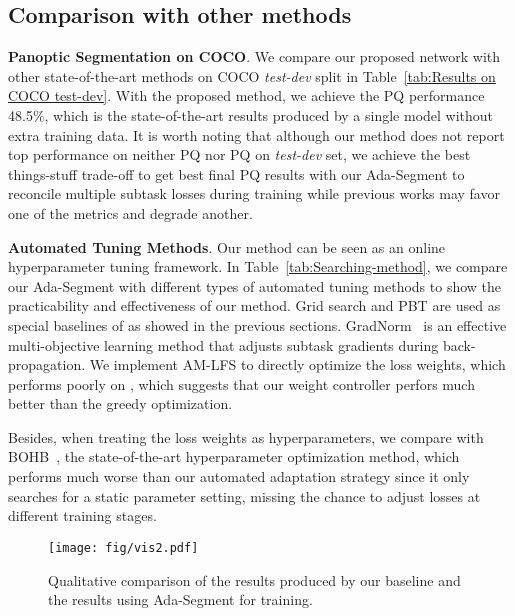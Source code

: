 \documentclass[letterpaper]{article} \usepackage{aaai21}  \usepackage{times}  \usepackage{helvet} \usepackage{courier}  \usepackage[hyphens]{url}  \usepackage{graphicx} \urlstyle{rm} \def\UrlFont{\rm}  \usepackage{natbib}  \usepackage{caption} \frenchspacing  \setlength{\pdfpagewidth}{8.5in}  \setlength{\pdfpageheight}{11in}
\begin{document}
 


 






\subsection{Comparison with other methods}


\noindent
\textbf{Panoptic Segmentation on COCO}.
We compare our proposed network with other state-of-the-art methods
on COCO \textit{test-dev} split in Table~\ref{tab:Results on COCO test-dev}. 
With the proposed method, we achieve the PQ performance 48.5\%, which
is the state-of-the-art results produced by a single model without
extra training data. 
It is worth noting that although our method does
not report top performance on neither PQ nor PQ on
\textit{test-dev} set, 
we achieve the best things-stuff trade-off to get best final PQ results
with our Ada-Segment to reconcile multiple subtask losses during training while previous works may favor
one of the metrics and degrade another. 
 

\noindent
\textbf{Automated Tuning Methods}.
Our method can be seen as an online hyperparameter tuning framework. 
In Table~\ref{tab:Searching-method}, we compare our Ada-Segment with different types
of automated tuning methods to show the practicability and effectiveness of our method.
Grid search and PBT\cite{jaderberg2017pbt} are used as special baselines of as showed in the previous sections. 
GradNorm~\cite{chen2017gradnorm} is an effective multi-objective learning method 
that adjusts subtask gradients during back-propagation. 
We implement AM-LFS\cite{li2019AMlfs} to directly optimize the loss weights, which 
performs poorly on , which suggests that our weight controller perfors much 
better than the greedy optimization.


Besides, when treating the loss weights as hyperparameters, we compare 
with BOHB~\cite{falkner2018bohb}, the state-of-the-art hyperparameter
optimization method, which performs much worse than our automated adaptation strategy since 
it only searches for a static parameter setting, missing the chance to adjust losses 
at different training stages. 

\begin{figure}[t]
  \centering    
\texttt{[image: fig/vis2.pdf]}    
\caption{Qualitative comparison of the results produced by our baseline and 
  the results using Ada-Segment for training. }
  \label{visualization}   
\end{figure}
\end{document}
